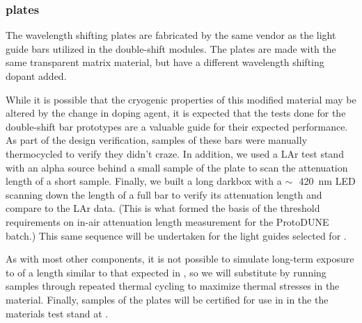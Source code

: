 

\subsubsection{ plates}

The  wavelength shifting plates are fabricated by the same vendor as the light guide bars utilized in the double-shift  modules.  The   plates are made with the same transparent matrix material, but have a different wavelength shifting dopant added.  

While it is possible that the cryogenic properties of this modified  material may be altered by the change in doping agent, it is expected that the tests done for the double-shift bar prototypes are a valuable guide for their expected performance.  As part of the design verification, samples of these bars were manually thermocycled to verify they didn't craze. In addition, we used 
a LAr test stand 
with an alpha source behind a small sample of the  plate to scan the attenuation length of a short sample. Finally, we built a long darkbox with a $\sim\,$~\SI{420}{nm} LED scanning down the length of a full bar to verify its attenuation length and compare to the LAr data. (This is what formed the basis of the threshold requirements on in-air attenuation length measurement for the ProtoDUNE batch.) 
This same sequence will be undertaken for the light guides selected for . 

As with most other components, it is not possible to simulate long-term exposure to  of a length similar to that expected in , so we will substitute by running samples through repeated thermal cycling to maximize thermal stresses in the material.  Finally, samples of the  plates will be certified for use in  in the the materials test stand at .  



